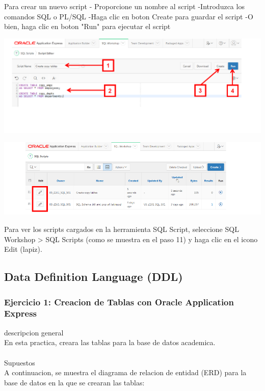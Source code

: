 \documentclass[12pt,letterpaper]{article}
\begin{document}
\begin{enumerate}[1.]
    
     \newpage
    
       Para crear un nuevo script
- Proporcione un nombre al script
-Introduzca los comandos SQL o PL/SQL
-Haga clic en boton Create para guardar el script
-O bien, haga clic en boton "Run" para ejecutar el script
    
    
    
    \includegraphics[width=15cm]{./carolinaImagen/4.png}
 
    
    
  
     \includegraphics[width=15cm]{./carolinaImagen/5.png}
    
      Para ver los scripts cargados en la herramienta SQL Script, seleccione SQL Workshop > SQL Scripts (como se muestra en el paso 11) y haga clic en el icono Edit (lapiz).
      
    
		\end{enumerate}
		




\newpage
\subsection{Data Definition Language (DDL)} 

\subsubsection{Ejercicio 1: Creacion de Tablas con Oracle Application Express} 
descripcion general  \\
En esta practica, creara las tablas para la base de datos academica. \\
 \\
Supuestos\\
A continuacion, se muestra el diagrama de relacion de entidad (ERD) para la base de datos en la que se crearan las tablas:\\
\end{document}
